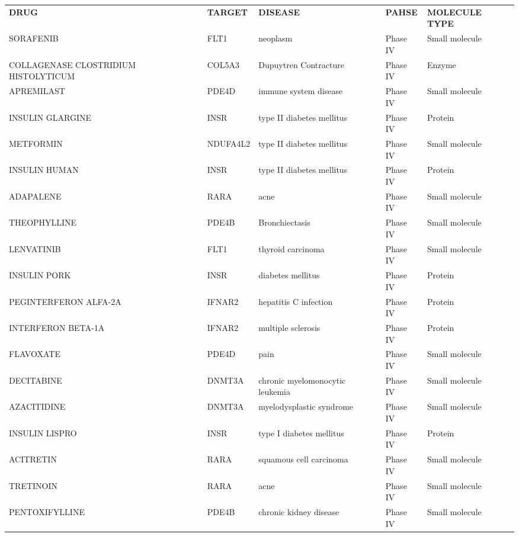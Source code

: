 \documentclass[fleqn,10pt]{SelfArx} %
\begin{document}
\renewcommand{\arraystretch}{1.2}

\begin{table}[ht]
	\centering
	\scriptsize
	\begin{tabularx}{\textwidth}{lXlll}
		\rowcolor{NavyBlue!80}
		 \textbf{\color{white} DRUG} & \textbf{\color{white} TARGET} & \textbf{\color{white} DISEASE} & \textbf{\color{white} PAHSE} & \textbf{\color{white} MOLECULE TYPE} \\
		SORAFENIB & FLT1 & neoplasm & Phase IV & Small molecule \\ 
		COLLAGENASE CLOSTRIDIUM HISTOLYTICUM & COL5A3 & Dupuytren Contracture & Phase IV & Enzyme \\ 
		APREMILAST & PDE4D & immune system disease & Phase IV & Small molecule \\ 
		INSULIN GLARGINE & INSR & type II diabetes mellitus & Phase IV & Protein \\ 
		METFORMIN & NDUFA4L2 & type II diabetes mellitus & Phase IV & Small molecule \\ 
		INSULIN HUMAN & INSR & type II diabetes mellitus & Phase IV & Protein \\ 
		ADAPALENE & RARA & acne & Phase IV & Small molecule \\ 
		THEOPHYLLINE & PDE4B & Bronchiectasis & Phase IV & Small molecule \\ 
		LENVATINIB & FLT1 & thyroid carcinoma & Phase IV & Small molecule \\ 
		INSULIN PORK & INSR & diabetes mellitus & Phase IV & Protein \\ 
		PEGINTERFERON ALFA-2A & IFNAR2 & hepatitis C infection & Phase IV & Protein \\ 
		INTERFERON BETA-1A & IFNAR2 & multiple sclerosis & Phase IV & Protein \\ 
		FLAVOXATE & PDE4D & pain & Phase IV & Small molecule \\ 
		DECITABINE & DNMT3A & chronic myelomonocytic leukemia & Phase IV & Small molecule \\ 
		AZACITIDINE & DNMT3A & myelodysplastic syndrome & Phase IV & Small molecule \\ 
		INSULIN LISPRO & INSR & type I diabetes mellitus & Phase IV & Protein \\ 
		ACITRETIN & RARA & squamous cell carcinoma & Phase IV & Small molecule \\ 
		TRETINOIN & RARA & acne & Phase IV & Small molecule \\ 
		PENTOXIFYLLINE & PDE4B & chronic kidney disease & Phase IV & Small molecule \\ 

\end{tabularx}
\end{table}
\end{document}
